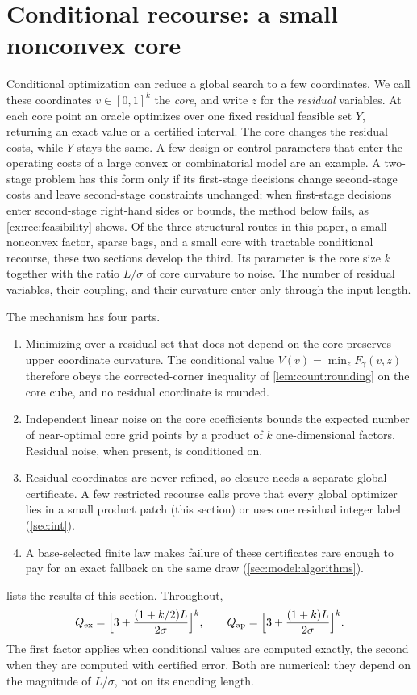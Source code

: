 \section{Conditional recourse: a small nonconvex core}\label{sec:rec}

Conditional optimization can reduce a global search to a few coordinates.
We call these coordinates $v\in[0,1]^k$ the \emph{core}, and write $z$ for
the \emph{residual} variables. At each core point an oracle optimizes over
one fixed residual feasible set $Y$, returning an exact value or a certified
interval. The core changes the residual costs, while $Y$ stays the same. A
few design or control parameters that enter the operating costs of a large
convex or combinatorial model are an example. A two-stage problem has this
form only if its first-stage decisions change second-stage costs and leave
second-stage constraints unchanged; when first-stage decisions enter
second-stage right-hand sides or bounds, the method below fails, as
\cref{ex:rec:feasibility} shows. Of the three structural routes in this
paper, a small nonconvex factor, sparse bags, and a small core with
tractable conditional recourse, these two sections develop the third. Its
parameter is the core size $k$ together with the ratio $L/\sigma$ of core
curvature to noise. The number of residual variables, their coupling, and
their curvature enter only through the input length.

The mechanism has four parts.
\begin{enumerate}[label=(\roman*)]
\item Minimizing over a residual set that does not depend on the core
preserves upper coordinate curvature. The conditional value
$V(v)=\min_zF_\gamma(v,z)$ therefore obeys the corrected-corner inequality
of \cref{lem:count:rounding} on the core cube, and no residual coordinate is
rounded.
\item Independent linear noise on the core coefficients bounds the expected
number of near-optimal core grid points by a product of $k$ one-dimensional
factors. Residual noise, when present, is conditioned on.
\item Residual coordinates are never refined, so closure needs a separate
global certificate. A few restricted recourse calls prove that every global
optimizer lies in a small product patch (this section) or uses one residual
integer label (\cref{sec:int}).
\item A base-selected finite law makes failure of these certificates rare
enough to pay for an exact fallback on the same draw
(\cref{sec:model:algorithms}).
\end{enumerate}
 lists the results of this section. Throughout,
\begin{equation}\label{eq:rec:Q}
 Q_{\rm ex}=\Bigl[3+\frac{(1+k/2)L}{2\sigma}\Bigr]^k,
 \qquad
 Q_{\rm ap}=\Bigl[3+\frac{(1+k)L}{2\sigma}\Bigr]^k .
\end{equation}
The first factor applies when conditional values are computed exactly, the
second when they are computed with certified error. Both are numerical:
they depend on the magnitude of $L/\sigma$, not on its encoding length.

